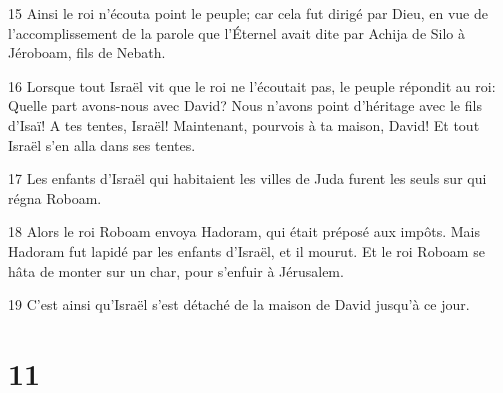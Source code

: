 \par 15 Ainsi le roi n'écouta point le peuple; car cela fut dirigé par Dieu, en vue de l'accomplissement de la parole que l'Éternel avait dite par Achija de Silo à Jéroboam, fils de Nebath.
\par 16 Lorsque tout Israël vit que le roi ne l'écoutait pas, le peuple répondit au roi: Quelle part avons-nous avec David? Nous n'avons point d'héritage avec le fils d'Isaï! A tes tentes, Israël! Maintenant, pourvois à ta maison, David! Et tout Israël s'en alla dans ses tentes.
\par 17 Les enfants d'Israël qui habitaient les villes de Juda furent les seuls sur qui régna Roboam.
\par 18 Alors le roi Roboam envoya Hadoram, qui était préposé aux impôts. Mais Hadoram fut lapidé par les enfants d'Israël, et il mourut. Et le roi Roboam se hâta de monter sur un char, pour s'enfuir à Jérusalem.
\par 19 C'est ainsi qu'Israël s'est détaché de la maison de David jusqu'à ce jour.

\chapter{11}

